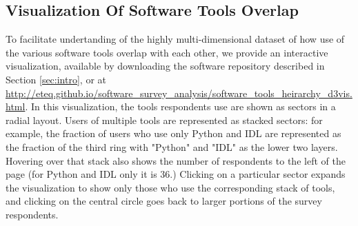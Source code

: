 \subsection{Visualization Of Software Tools Overlap}
\label{ssec:d3viz}

To facilitate undertanding of the highly multi-dimensional dataset of how use of the various software tools overlap with each other, we provide an interactive visualization, available by downloading the software repository described in Section \ref{sec:intro}, or at \url{http://eteq.github.io/software_survey_analysis/software_tools_heirarchy_d3vis.html}. In this visualization, the tools respondents use are shown as sectors in a radial layout.  Users of multiple tools are represented as stacked sectors: for example, the fraction of users who use only Python and IDL are represented as the fraction of the third ring with "Python" and "IDL" as the lower two layers.  Hovering over that stack also shows the number of respondents to the left of the page (for Python and IDL only it is 36.)  Clicking on a particular sector expands the visualization to show only those who use the corresponding stack of tools, and clicking on the central circle goes back to larger portions of the survey respondents.